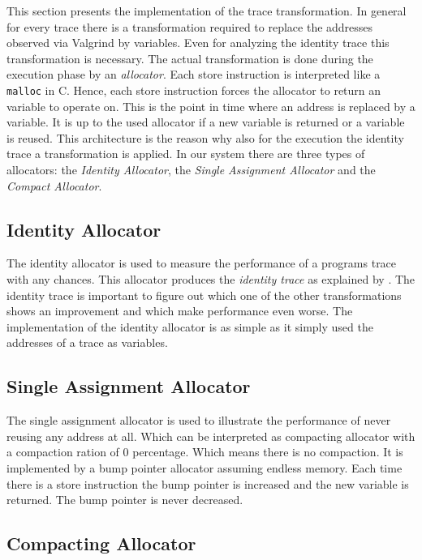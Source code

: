 \documentclass[onecolumn, openright, master, english, signatures]{dbrgrptt}
\begin{document}
This section presents the implementation of the trace transformation. In general for every trace there is a transformation required to replace the addresses observed via Valgrind by variables. Even for analyzing the identity \ac{trace} this transformation is necessary. The actual transformation is done during the execution phase by an \emph{allocator}. Each store instruction is interpreted like a \texttt{malloc} in C. Hence, each store instruction forces the allocator to return an variable to operate on. This is the point in time where an address is replaced by a variable.  It is up to the used allocator if a new variable is returned or a variable is reused. This architecture is the reason why also for the execution the identity \ac{trace} a transformation is applied. In our system there are three types of allocators: the \emph{Identity Allocator}, the \emph{Single Assignment Allocator} and the \emph{Compact Allocator}.

\subsection{Identity Allocator}\label{ssec:allocator-original}

The identity allocator is used to measure the performance of a programs \ac{trace} with any chances. This allocator produces the \emph{identity \ac{trace}} as explained by . The identity \ac{trace} is important to figure out which one of the other transformations shows an improvement and which make performance even worse. The implementation of the identity allocator is as simple as it simply used the addresses of a \ac{trace} as variables.

\subsection{Single Assignment Allocator}\label{ssec:allocator-single-assignment}

The single assignment allocator is used to illustrate the performance of never reusing any address at all. Which can be interpreted as compacting allocator with a compaction ration of 0 percentage. Which means there is no compaction. It is implemented by a bump pointer allocator assuming endless memory. Each time there is a store instruction the bump pointer is increased and the new variable is returned. The bump pointer is never decreased.

\subsection{Compacting Allocator}\label{ssec:allocator-compact}
\end{document}
